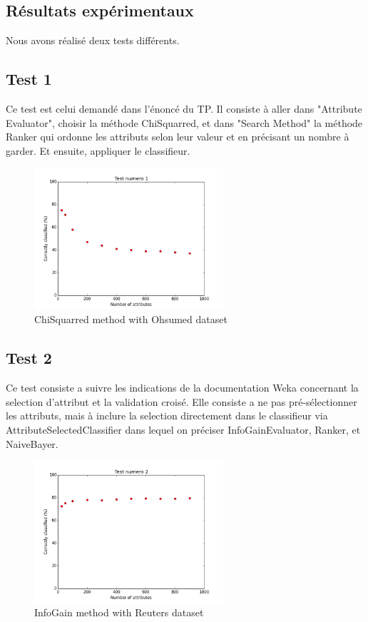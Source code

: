 \documentclass[a4paper,10pt]{article}
\begin{document}
\subsection{Résultats expérimentaux}
Nous avons réalisé deux tests différents.
\subsection{Test 1}
Ce test est celui demandé dans l'énoncé du TP. Il consiste à aller dans "Attribute Evaluator", choisir la méthode ChiSquarred, et dans "Search Method" la méthode Ranker qui ordonne les attributs selon leur valeur et en précisant un nombre à garder. Et ensuite, appliquer le classifieur.
\begin{figure}[H]
	\includegraphics[width=7cm]{images/part2.png} 
	\centering
	\caption{ChiSquarred method with Ohsumed dataset}
	\label{fig:comp}
\end{figure}

\subsection{Test 2}
Ce test consiste a suivre les indications de la documentation Weka concernant la selection d'attribut et la validation croisé. Elle consiste a ne pas pré-sélectionner les attributs, mais à inclure la selection directement dans le classifieur via AttributeSelectedClassifier dans lequel on préciser InfoGainEvaluator, Ranker, et NaiveBayer.

\begin{figure}[H]
	\includegraphics[width=7cm]{images/part2b.png} 
	\centering
	\caption{InfoGain method with Reuters dataset}
	\label{fig:comp}
\end{figure}
\end{document}
